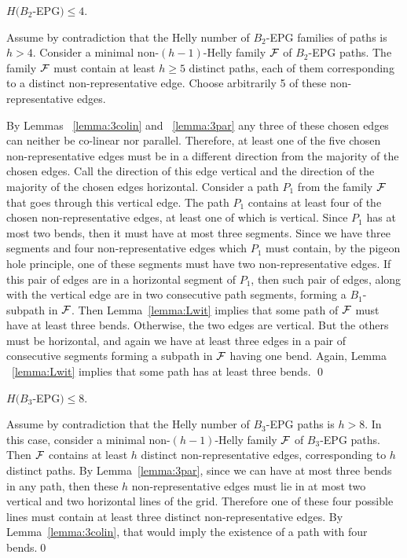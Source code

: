 \begin{claim}\label{claim:upper-B2}
$H(B_2$-EPG$) \leq 4.$
\end{claim}

\proof
Assume by contradiction that the Helly number of  $B_2$-EPG families of paths is $h > 4$. Consider a minimal non-$(h-1)$-Helly family $\cal F$ of $B_2$-EPG paths. The family  $\cal F$ must contain at least $h \geq 5$ distinct paths, each of them corresponding to a distinct non-representative edge. Choose arbitrarily 5 of these non-representative edges.

By Lemmas ~\ref{lemma:3colin} and ~\ref{lemma:3par} any three of these chosen edges can  neither be co-linear nor parallel. Therefore, at least one of the five chosen non-representative edges must be in a different direction from the majority of the chosen edges. Call the direction of this edge vertical and the direction of the majority of the chosen edges horizontal. Consider a path $P_1$ from the family $\cal F$ that goes through this vertical edge. 
The path $P_1$ contains at least four of the chosen non-representative edges, at least one of which is vertical. Since $P_1$ has at most two bends, then it must have at most three segments. Since we have three segments and four non-representative edges which $P_1$ must contain, by the pigeon hole principle, one of these segments must have two non-representative edges. If this pair of edges are in a horizontal segment of $P_1$, then such pair of edges, along with the vertical edge are in two consecutive path segments, forming a $B_1$-subpath in $\cal F$. Then Lemma~\ref{lemma:Lwit} implies that some path of $\cal F$ must have at least three bends.   Otherwise, the two edges are vertical. But the others must be horizontal, and again we have at least three edges in a pair of consecutive segments forming a subpath in $\cal F$ having one bend. Again,  Lemma ~\ref{lemma:Lwit} implies that some path has at least three bends.
\qed

\begin{claim}\label{claim:upper-B3}
$H(B_3$-EPG$) \leq 8.$
\end{claim}

\proof
Assume by contradiction that the Helly number of  $B_3$-EPG paths is $h > 8$. In this case, consider a minimal non-$(h-1)$-Helly family $\cal F$ of $B_3$-EPG paths. Then $\cal F$ contains at least $h$  distinct non-representative edges,  corresponding to $h$ distinct paths.  By Lemma~\ref{lemma:3par}, since we can have at most three bends in any path, then these $h$  non-representative edges must lie in at most two vertical and two horizontal lines of the grid. Therefore one of these four possible lines must contain at least three distinct non-representative edges. By Lemma~\ref{lemma:3colin},  that would imply the existence of a path with four bends.\qed

